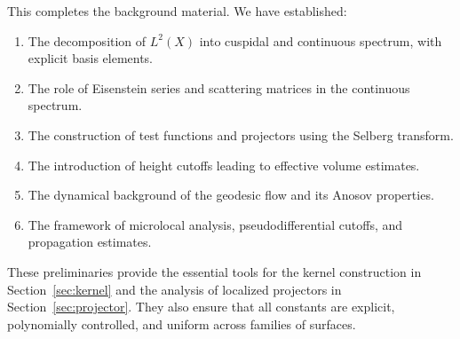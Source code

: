 This completes the background material. We have established:

\begin{enumerate}
  \item The decomposition of $L^2(X)$ into cuspidal and continuous spectrum, with explicit basis elements.
  \item The role of Eisenstein series and scattering matrices in the continuous spectrum.
  \item The construction of test functions and projectors using the Selberg transform.
  \item The introduction of height cutoffs leading to effective volume estimates.
  \item The dynamical background of the geodesic flow and its Anosov properties.
  \item The framework of microlocal analysis, pseudodifferential cutoffs, and propagation estimates.
\end{enumerate}

These preliminaries provide the essential tools for the kernel construction in Section~\ref{sec:kernel} and the analysis of localized projectors in Section~\ref{sec:projector}. They also ensure that all constants are explicit, polynomially controlled, and uniform across families of surfaces.
